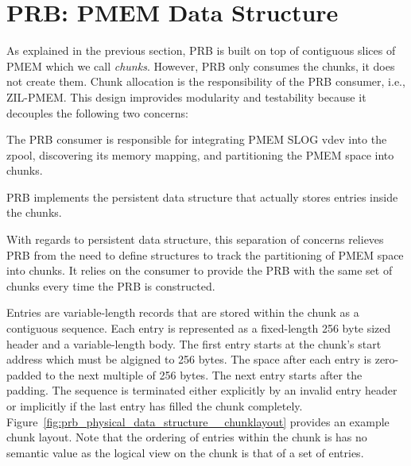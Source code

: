 \documentclass[12pt,a4paper,twoside]{book}
\begin{document}
\section{PRB: PMEM Data Structure}\label{di:prb:pmemdatastructure}
As explained in the previous section, PRB is built on top of contiguous slices of PMEM which we call \textit{chunks}.
However, PRB only consumes the chunks, it does not create them.
Chunk allocation is the responsibility of the PRB consumer, i.e., ZIL-PMEM.
This design improvides modularity and testability because it decouples the following two concerns:
\begin{description}[noitemsep,leftmargin=1.5cm,labelindent=1cm]
    \item[Resource Aquisition] The PRB consumer is responsible for integrating PMEM SLOG vdev into the zpool, discovering its memory mapping, and partitioning the PMEM space into chunks.
    \item[PMEM Data Structure] PRB implements the persistent data structure that actually stores entries inside the chunks.
\end{description}
With regards to persistent data structure, this separation of concerns relieves PRB from the need to define structures to track the partitioning of PMEM space into chunks.
It relies on the consumer to provide the PRB with the same set of chunks every time the PRB is constructed.


Entries are variable-length records that are stored within the chunk as a contiguous sequence.
Each entry is represented as a fixed-length 256 byte sized header and a variable-length body.
The first entry starts at the chunk's start address which must be algigned to 256 bytes.
The space after each entry is zero-padded to the next multiple of 256 bytes.
The next entry starts after the padding.
The sequence is terminated either explicitly by an invalid entry header or implicitly if the last entry has filled the chunk completely.
Figure~\ref{fig:prb_physical_data_structure__chunklayout} provides an example chunk layout.
Note that the ordering of entries within the chunk is has no semantic value as the logical view on the chunk is that of a set of entries.
\end{document}
